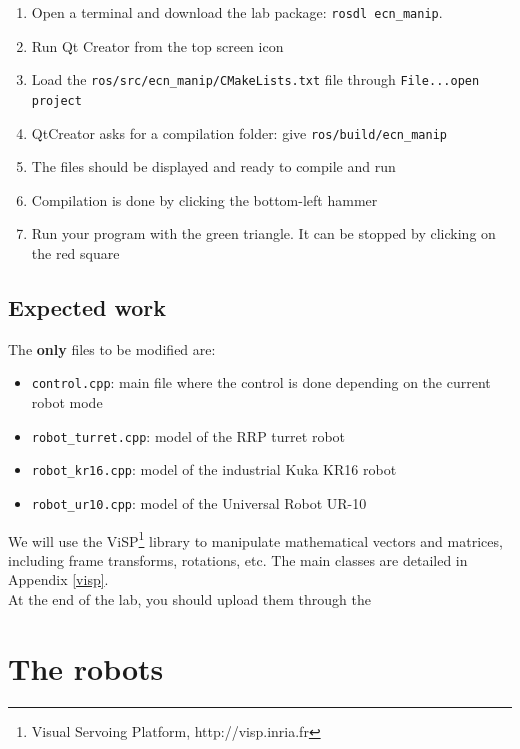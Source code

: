 \documentclass{ecnreport}
\begin{document}
  \begin{enumerate}
    \item Open a terminal and download the lab package: \texttt{rosdl ecn\_manip}.
    \item Run Qt Creator from the top screen icon
    \item Load the \texttt{ros/src/ecn\_manip/CMakeLists.txt} file through \texttt{File...open project}
    \item QtCreator asks for a compilation folder: give \texttt{ros/build/ecn\_manip}
    \item The files should be displayed and ready to compile and run
    \item Compilation is done by clicking the bottom-left hammer
    \item Run your program with the green triangle. It can be stopped by clicking on the red square
  \end{enumerate}
  
  \subsection{Expected work}
  
  The {\bf only} files to be modified are:
  \begin{itemize}
    \item \texttt{control.cpp}: main file where the control is done depending on the current robot mode
    \item \texttt{robot\_turret.cpp}: model of the RRP turret robot
    \item \texttt{robot\_kr16.cpp}: model of the industrial Kuka KR16 robot
    \item \texttt{robot\_ur10.cpp}: model of the Universal Robot UR-10
  \end{itemize}
  We will use the ViSP\footnote{Visual Servoing Platform, http://visp.inria.fr} library to manipulate mathematical vectors and matrices, including frame transforms, rotations, etc. The main classes are detailed in Appendix \ref{visp}.\\
  At the end of the lab, you should upload them through the 
  
  \section{The robots}
  
  \def\wMe{{}^w\M_e}
  
\end{document}
